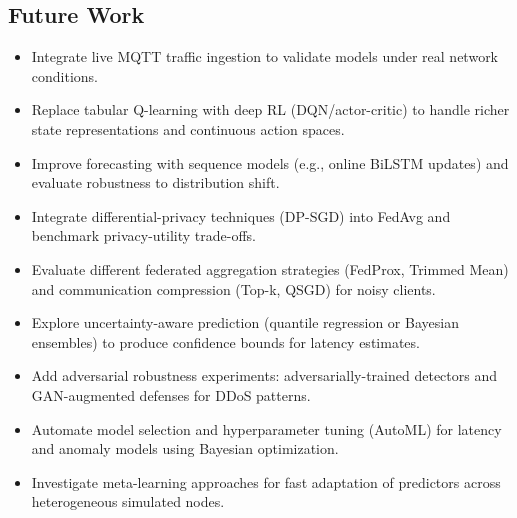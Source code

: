 \subsection{Future Work}

\begin{itemize}
    \item Integrate live MQTT traffic ingestion to validate models under real network conditions.
    \item Replace tabular Q-learning with deep RL (DQN/actor-critic) to handle richer state representations and continuous action spaces.
    \item Improve forecasting with sequence models (e.g., online BiLSTM updates) and evaluate robustness to distribution shift.
    \item Integrate differential-privacy techniques (DP-SGD) into FedAvg and benchmark privacy-utility trade-offs.
    \item Evaluate different federated aggregation strategies (FedProx, Trimmed Mean) and communication compression (Top-k, QSGD) for noisy clients.
    \item Explore uncertainty-aware prediction (quantile regression or Bayesian ensembles) to produce confidence bounds for latency estimates.
    \item Add adversarial robustness experiments: adversarially-trained detectors and GAN-augmented defenses for DDoS patterns.
    \item Automate model selection and hyperparameter tuning (AutoML) for latency and anomaly models using Bayesian optimization.
    \item Investigate meta-learning approaches for fast adaptation of predictors across heterogeneous simulated nodes.
\end{itemize}

